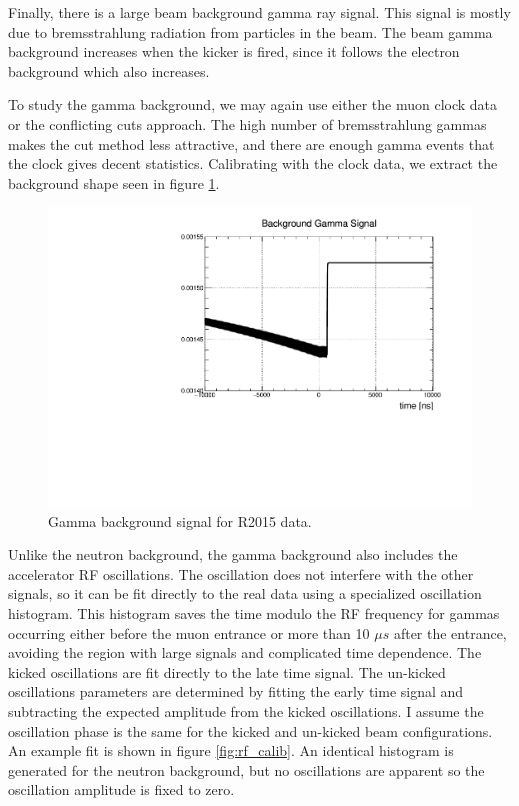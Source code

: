 Finally, there is a large beam background gamma ray signal.
This signal is mostly due to bremsstrahlung radiation from particles in the beam.
The beam gamma background increases when the kicker is fired, since it follows the electron background which also increases.

To study the gamma background, we may again use either the muon clock data or the conflicting cuts approach.
The high number of bremsstrahlung gammas makes the cut method less attractive, and there are enough gamma events that the clock gives decent statistics.
Calibrating with the clock data, we extract the background shape seen in figure \ref{fig:shape_gammabg}.

\begin{figure}[h]
  \includegraphics[width=\textwidth]{neutrons/figures/shape_gammaBG.pdf}
  \caption{Gamma background signal for R2015 data.}
  \label{fig:shape_gammabg}
\end{figure}

Unlike the neutron background, the gamma background also includes the accelerator RF oscillations.  
The oscillation does not interfere with the other signals, so it can be fit directly to the real data using a specialized oscillation histogram.  
This histogram saves the time modulo the RF frequency for gammas occurring either before the muon entrance or more than 10 $\mu s$ after the entrance, avoiding the region with large signals and complicated time dependence.
The kicked oscillations are fit directly to the late time signal.
The un-kicked oscillations parameters are determined by fitting the early time signal and subtracting the expected amplitude from the kicked oscillations.
I assume the oscillation phase is the same for the kicked and un-kicked beam configurations.
An example fit is shown in figure \ref{fig:rf_calib}. 
An identical histogram is generated for the neutron background, but no oscillations are apparent so the oscillation amplitude is fixed to zero.

